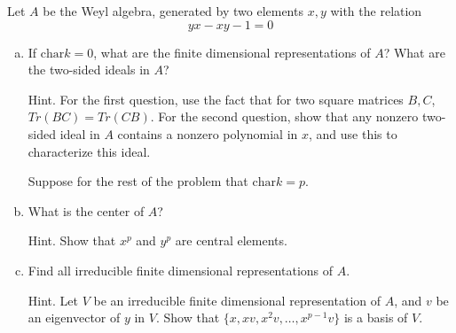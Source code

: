 \documentclass[twoside]{article}
\begin{document}
\newpage

\begin{ejercicio}{1.26}
Let $A$ be the Weyl algebra, generated by two elements $x,y$ with the relation
\[ yx - xy - 1 = 0 \]
\begin{enumerate}[(a)]
\item If $\text{char} k = 0$, what are the finite dimensional representations of $A$? What are the two-sided ideals in $A$?

Hint. For the first question, use the fact that for two square matrices $B,C$, $Tr(BC) = Tr(CB)$. For the second question, show that any nonzero two-sided ideal in $A$ contains a nonzero polynomial in $x$, and use this to characterize this ideal.

Suppose for the rest of the problem that $\text{char} k = p$.
\item What is the center of $A$?

Hint. Show that $x^p$ and $y^p$ are central elements.

\item Find all irreducible finite dimensional representations of $A$.

Hint. Let $V$ be an irreducible finite dimensional representation of $A$, and $v$ be an eigenvector of $y$ in $V$. Show that $\{x, xv, x^2v, \dots, x^{p-1}v\}$ is a basis of $V$.
\end{enumerate}
\end{ejercicio}
\end{document}
